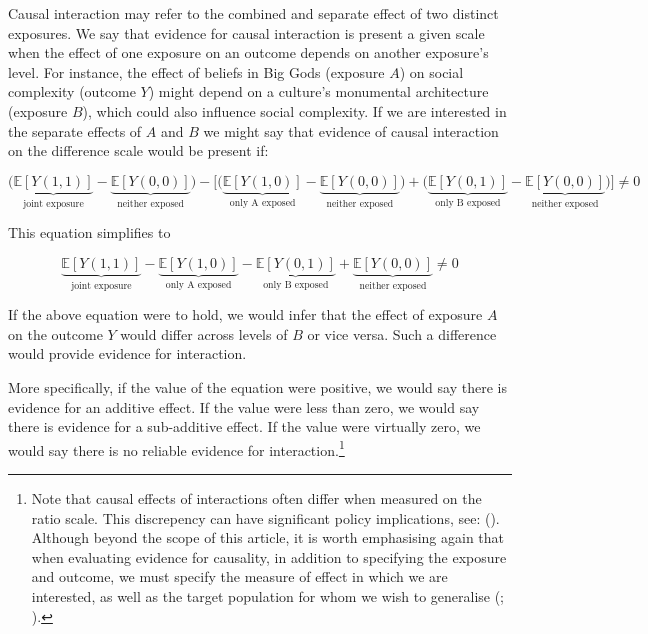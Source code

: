 \documentclass[
  singlecolumn,
  9pt]{article}
\begin{document}
Causal interaction may refer to the combined and separate effect of two
distinct exposures. We say that evidence for causal interaction is
present a given scale when the effect of one exposure on an outcome
depends on another exposure's level. For instance, the effect of beliefs
in Big Gods (exposure \(A\)) on social complexity (outcome \(Y\)) might
depend on a culture's monumental architecture (exposure \(B\)), which
could also influence social complexity. If we are interested in the
separate effects of \(A\) and \(B\) we might say that evidence of causal
interaction on the difference scale would be present if:

\[\bigg(\underbrace{\mathbb{E}[Y(1,1)]}_{\text{joint exposure}} - \underbrace{\mathbb{E}[Y(0,0)]}_{\text{neither exposed}}\bigg) - \bigg[ \bigg(\underbrace{\mathbb{E}[Y(1,0)]}_{\text{only A exposed}} - \underbrace{\mathbb{E}[Y(0,0)]}_{\text{neither exposed}}\bigg) + \bigg(\underbrace{\mathbb{E}[Y(0,1)]}_{\text{only B exposed}} - \underbrace{\mathbb{E}[Y(0,0)]}_{\text{neither exposed}} \bigg)\bigg] \neq 0 \]

This equation simplifies to

\[ \underbrace{\mathbb{E}[Y(1,1)]}_{\text{joint exposure}} - \underbrace{\mathbb{E}[Y(1,0)]}_{\text{only A exposed}} - \underbrace{\mathbb{E}[Y(0,1)]}_{\text{only B exposed}} + \underbrace{\mathbb{E}[Y(0,0)]}_{\text{neither exposed}} \neq 0 \]

If the above equation were to hold, we would infer that the effect of
exposure \(A\) on the outcome \(Y\) would differ across levels of \(B\)
or vice versa. Such a difference would provide evidence for interaction.

More specifically, if the value of the equation were positive, we would
say there is evidence for an additive effect. If the value were less
than zero, we would say there is evidence for a sub-additive effect. If
the value were virtually zero, we would say there is no reliable
evidence for interaction.\footnote{Note that causal effects of
  interactions often differ when measured on the ratio scale. This
  discrepency can have significant policy implications, see:
  (). Although
  beyond the scope of this article, it is worth emphasising again that
  when evaluating evidence for causality, in addition to specifying the
  exposure and outcome, we must specify the measure of effect in which
  we are interested, as well as the target population for whom we wish
  to generalise (;
  ).}
\end{document}
